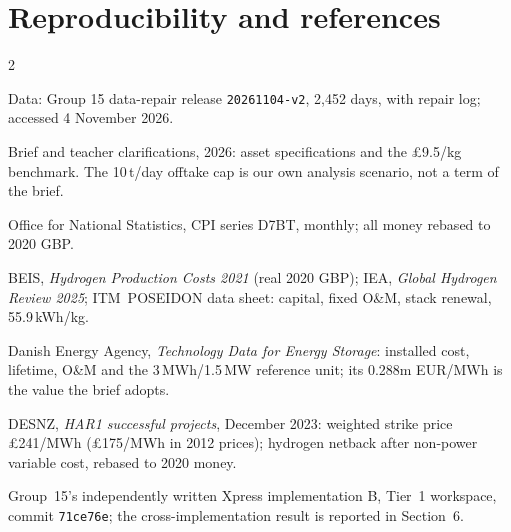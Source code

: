\documentclass[11pt,a4paper]{article}
\begin{document}
\section*{Reproducibility and references}
{\scriptsize\raggedright{}
\setlength{\columnsep}{14pt}%
\begin{multicols}{2}
\begin{enumerate}[label={[\arabic*]},leftmargin=1.8em,itemsep=1pt,topsep=2pt,parsep=0pt]
  \item Data: Group 15 data-repair release \texttt{20261104-v2}, 2,452 days, with repair log;
        accessed 4 November 2026.
  \item Brief and teacher clarifications, 2026: asset specifications and the £9.5/kg benchmark. The
        10\,t/day offtake cap is our own analysis scenario, not a term of the brief.
  \item Office for National Statistics, CPI series D7BT, monthly; all money rebased to 2020 GBP.
  \item BEIS, \emph{Hydrogen Production Costs 2021} (real 2020 GBP); IEA, \emph{Global Hydrogen
        Review 2025}; \mbox{ITM POSEIDON} data sheet: capital, fixed O\&M, stack renewal,
        55.9\,kWh/kg.
  \item Danish Energy Agency, \emph{Technology Data for Energy Storage}: installed cost, lifetime,
        O\&M and the 3\,MWh/1.5\,MW reference unit; its 0.288m EUR/MWh is the value the brief
        adopts.
  \item DESNZ, \emph{HAR1 successful projects}, December 2023: weighted strike price £241/MWh
        (£175/MWh in 2012 prices); hydrogen netback after non-power variable cost, rebased to
        2020 money.
  \item Group~15's independently written Xpress implementation B, Tier~1 workspace, commit
        \texttt{71ce76e}; the cross-implementation result is reported in Section~6.
\end{enumerate}
\end{multicols}}
\end{document}
